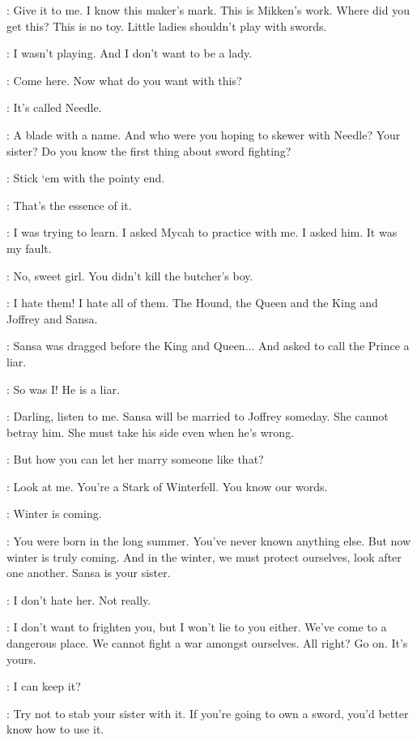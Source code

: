 \NED: Give it to me. I know this maker's mark. This is Mikken's work. Where did you get this? This is no toy. Little ladies shouldn't play with swords. 

\ARYA: I wasn't playing. And I don't want to be a lady. 

\NED: Come here. Now what do you want with this? 

\ARYA: It's called Needle. 

\NED: A blade with a name. And who were you hoping to skewer with Needle? Your sister? Do you know the first thing about sword fighting? 

\ARYA: Stick `em with the pointy end. 

\NED: That's the essence of it. 

\ARYA: I was trying to learn. I asked Mycah to practice with me. I asked him. It was my fault. 

\NED: No, sweet girl. You didn't kill the butcher's boy. 

\ARYA: I hate them! I hate all of them. The Hound, the Queen and the King and Joffrey and Sansa. 

\NED: Sansa was dragged before the King and Queen$\ldots$ And asked to call the Prince a liar. 

\ARYA: So was I! He is a liar. 

\NED: Darling, listen to me. Sansa will be married to Joffrey someday. She cannot betray him. She must take his side even when he's wrong. 

\ARYA: But how you can let her marry someone like that? 

\NED: Look at me. You're a Stark of Winterfell. You know our words. 

\ARYA: Winter is coming. 

\NED: You were born in the long summer. You've never known anything else. But now winter is truly coming. And in the winter, we must protect ourselves, look after one another. Sansa is your sister. 

\ARYA: I don't hate her. Not really. 

\NED: I don't want to frighten you, but I won't lie to you either. We've come to a dangerous place. We cannot fight a war amongst ourselves. All right?  Go on. It's yours. 

\ARYA: I can keep it? 

\NED: Try not to stab your sister with it. If you're going to own a sword, you'd better know how to use it. 

